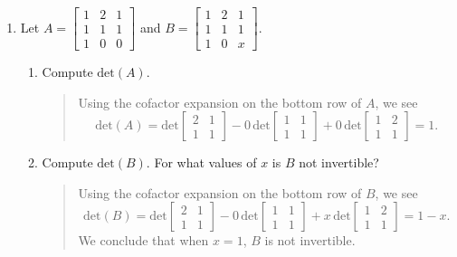 \documentclass[letter]{article}
\newcommand{\Det}{\mathrm{det}}
\newcommand{\mat}[1]{\begin{bmatrix}#1\end{bmatrix}}
\begin{document}
\begin{enumerate}
		\item Let $A=\mat{1&2&1\\1&1&1\\1&0&0}$ and $B=\mat{1&2&1\\1&1&1\\1&0&x}$.
		\begin{enumerate}
			\item Compute $\Det(A)$.
					\begin{quote}
						Using the cofactor expansion on the bottom row of $A$, we see
						\[
							\Det(A) = \Det\mat{2&1\\1&1}-0\,\Det\mat{1&1\\1&1}+0\,\Det\mat{1&2\\1&1} = 
							1.
						\]
					\end{quote}
			\item Compute $\Det(B)$.  For what values of $x$ is $B$ not invertible?
					\begin{quote}
						Using the cofactor expansion on the bottom row of $B$, we see
						\[
							\Det(B) = \Det\mat{2&1\\1&1}-0\,\Det\mat{1&1\\1&1}+x\,\Det\mat{1&2\\1&1} = 
							1-x.
						\]
						We conclude that when $x=1$, $B$ is not invertible.
					\end{quote}
		\end{enumerate}


\end{enumerate}
\end{document}
